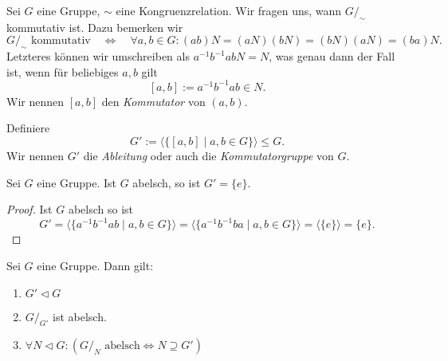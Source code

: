\begin{remark}
    Sei $G$ eine Gruppe, $\sim$ eine Kongruenzrelation. Wir fragen uns, wann $G/_\sim$ kommutativ ist. Dazu bemerken wir
    $$ G/_\sim \textrm{ kommutativ} \quad \Leftrightarrow \quad \forall a, b \in G: (ab)N = (aN) (bN) = (bN) (aN) = (ba)N. $$
    Letzteres können wir umschreiben als $a^{-1} b^{-1} a b N = N$, was genau dann der Fall ist, wenn für beliebiges $a, b$ gilt
    $$ [a, b] := a^{-1} b^{-1} a b \in N. $$
    Wir nennen $[a, b]$ den \emph{Kommutator}  von $(a, b)$.
\end{remark}

\begin{definition}
    Definiere
    $$ G' := \langle \{ [a, b] \mid a, b \in G \} \rangle \leq G. $$
    Wir nennen $G'$ die \emph{Ableitung} oder auch die \emph{Kommutatorgruppe} von $G$. 
\end{definition}
    
\begin{proposition}
    Sei $G$ eine Gruppe. Ist $G$ abelsch, so ist $G' = \{ e \}$.
\end{proposition}

\begin{proof}
    Ist $G$ abelsch so ist
    $$ G' = \langle \{ a^{-1} b^{-1} a b \mid a, b \in G \} \rangle = \langle \{ a^{-1} b^{-1} b a \mid a, b \in G \} \rangle = \langle \{e\} \rangle = \{e\}. $$
\end{proof}

\begin{theorem}
    Sei $G$ eine Gruppe. Dann gilt:
    \begin{enumerate}
        \item $G' \vartriangleleft G$
        \item $G/_{G'}$ ist abelsch.
        \item $\forall N \vartriangleleft G: ( G/_N \textrm{ abelsch} \Leftrightarrow N \supseteq G')$
    \end{enumerate}
\end{theorem}

